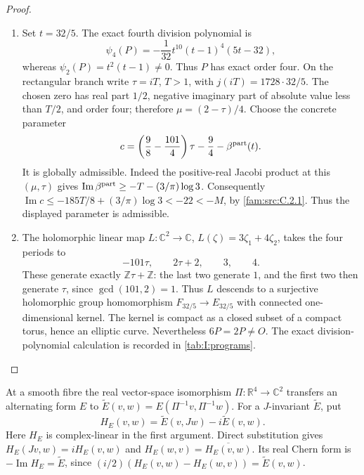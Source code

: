 \begin{proof}
\begin{enumerate}[label=\arabic*.,leftmargin=*]
\item Set \(t=32/5\). The exact fourth division polynomial is
\[
 \psi_4(P)=-\frac1{32}t^{10}(t-1)^4(5t-32),
\]
whereas \(\psi_2(P)=t^2(t-1)\ne0\). Thus \(P\) has exact order four.
On the rectangular branch write \(\tau=iT\), \(T>1\), with
\(j(iT)=1728\cdot32/5\). The chosen zero has real part \(1/2\), negative
imaginary part of absolute value less than \(T/2\), and order four;
therefore \(\mu=(2-\tau)/4\). Choose the concrete parameter
\[
 c=\left(\frac98-\frac{101}{4}\right)\tau-\frac94
       -\beta^{\rm part}(t).
\]
It is globally admissible. Indeed the positive-real Jacobi product at this
\((\mu,\tau)\) gives
\(\operatorname{Im}\beta^{\rm part}\geq-T-(3/\pi)\log3\).
Consequently
\(\operatorname{Im}c\leq-185T/8+(3/\pi)\log3<-22<-M\), by \ref{fam:src:C.2.1}.
Thus the displayed parameter is admissible.

\item The holomorphic linear map \(L:\mathbb C^2\to\mathbb C\),
\(L(\zeta)=3\zeta_1+4\zeta_2\), takes the four periods to
\[
 -101\tau,\qquad2\tau+2,\qquad3,\qquad4.
\]
These generate exactly \(\mathbb Z\tau+\mathbb Z\): the last two generate
\(1\), and the first two then generate \(\tau\), since
\(\gcd(101,2)=1\). Thus \(L\) descends to a surjective holomorphic group
homomorphism \(F_{32/5}\to E_{32/5}\) with connected one-dimensional
kernel. The kernel is compact as a closed subset of a compact torus,
hence an elliptic curve. Nevertheless \(6P=2P\ne O\).
The exact division-polynomial calculation is recorded in
\cref{tab:I:programs}.
\end{enumerate}
\end{proof}

\begin{definition}\hypertarget{tag-IP03}{}\label{I:def:Hermitian-form}
At a smooth fibre the real vector-space isomorphism
$\Pi:\mathbb R^4\to\mathbb C^2$ transfers an alternating form $E$ to
$\widetilde E(v,w)=E(\Pi^{-1}v,\Pi^{-1}w)$. For a $J$-invariant
$\widetilde E$, put
\[
 H_E(v,w)=\widetilde E(v,Jw)-i\widetilde E(v,w).
\]
Here $H_E$ is complex-linear in the first argument. Direct substitution
gives $H_E(Jv,w)=iH_E(v,w)$ and
$H_E(w,v)=\overline{H_E(v,w)}$. Its real Chern form is
$-\operatorname{Im}H_E=\widetilde E$, since
$(i/2)(H_E(v,w)-H_E(w,v))=\widetilde E(v,w)$.
\end{definition}

